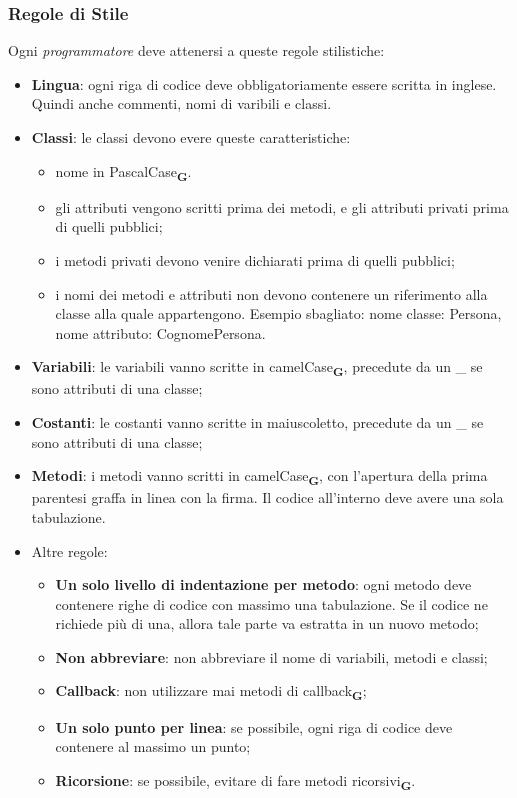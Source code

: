 \subsubsection{Regole di Stile}
Ogni \textit{programmatore} deve attenersi a queste regole stilistiche:
\begin{itemize}
    \item \textbf{Lingua}: ogni riga di codice deve obbligatoriamente essere scritta in inglese. Quindi anche commenti, nomi di varibili e classi.
    \item \textbf{Classi}: le classi devono evere queste caratteristiche:
          \begin{itemize}
              \item nome in PascalCase\textsubscript{\textbf{G}}.
              \item gli attributi vengono scritti prima dei metodi, e gli attributi privati prima di quelli pubblici;
              \item i metodi privati devono venire dichiarati prima di quelli pubblici;
              \item i nomi dei metodi e attributi non devono contenere un riferimento alla classe alla quale appartengono. Esempio sbagliato: nome classe: Persona, nome attributo: CognomePersona.
          \end{itemize}
    \item \textbf{Variabili}: le variabili vanno scritte in camelCase\textsubscript{\textbf{G}}, precedute da un \_ se sono attributi di una classe;
    \item \textbf{Costanti}: le costanti vanno scritte in maiuscoletto, precedute da un \_ se sono attributi di una classe;
    \item \textbf{Metodi}: i metodi vanno scritti in camelCase\textsubscript{\textbf{G}}, con l'apertura della prima parentesi graffa in linea con la firma. Il codice all'interno deve avere una sola tabulazione.
    \item Altre regole:
          \begin{itemize}
              \item \textbf{Un solo livello di indentazione per metodo}: ogni metodo deve contenere righe di codice con massimo una tabulazione. Se il codice ne richiede più di una, allora tale parte va estratta in un nuovo metodo;
              \item \textbf{Non abbreviare}: non abbreviare il nome di variabili, metodi e classi;
              \item \textbf{Callback}: non utilizzare mai metodi di callback\textsubscript{\textbf{G}};
              \item \textbf{Un solo punto per linea}: se possibile, ogni riga di codice deve contenere al massimo un punto;
              \item \textbf{Ricorsione}: se possibile, evitare di fare metodi ricorsivi\textsubscript{\textbf{G}}.
          \end{itemize}
\end{itemize}
